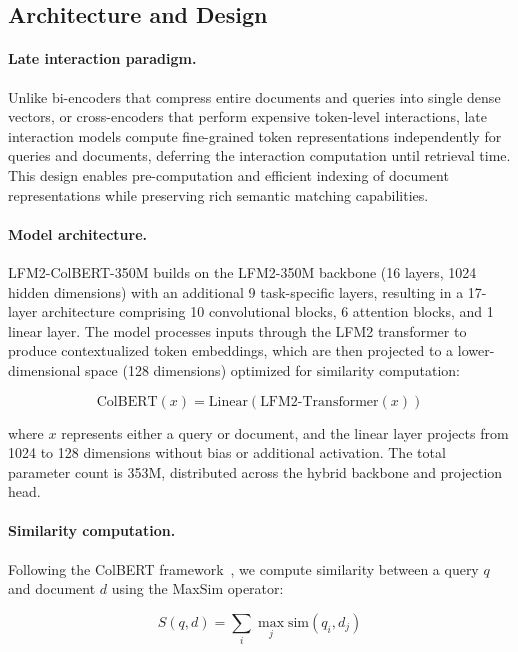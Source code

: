 \documentclass{article}
\begin{document}
\subsection{Architecture and Design}

\paragraph{Late interaction paradigm.}
Unlike bi-encoders that compress entire documents and queries into single dense vectors, or cross-encoders that perform expensive token-level interactions, late interaction models compute fine-grained token representations independently for queries and documents, deferring the interaction computation until retrieval time. This design enables pre-computation and efficient indexing of document representations while preserving rich semantic matching capabilities.

\paragraph{Model architecture.}
LFM2-ColBERT-350M builds on the LFM2-350M backbone (16 layers, 1024 hidden dimensions) with an additional 9 task-specific layers, resulting in a 17-layer architecture comprising 10 convolutional blocks, 6 attention blocks, and 1 linear layer. The model processes inputs through the LFM2 transformer to produce contextualized token embeddings, which are then projected to a lower-dimensional space (128 dimensions) optimized for similarity computation:

\begin{equation}
\text{ColBERT}(x) = \mathrm{Linear}(\text{LFM2-Transformer}(x))
\end{equation}

where $x$ represents either a query or document, and the linear layer projects from 1024 to 128 dimensions without bias or additional activation. The total parameter count is 353M, distributed across the hybrid backbone and projection head.

\paragraph{Similarity computation.}
Following the ColBERT framework~\citep{khattab2020colbert}, we compute similarity between a query $q$ and document $d$ using the MaxSim operator:

\begin{equation}
S(q, d) = \sum_{i} \max_{j} \text{sim}(q_i, d_j)
\end{equation}
\end{document}
